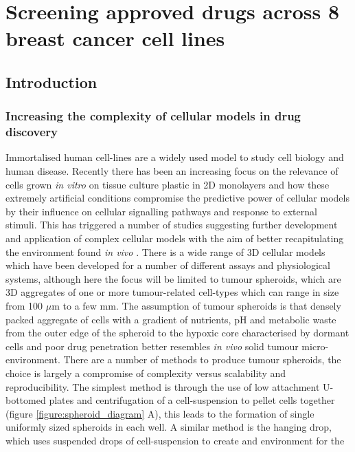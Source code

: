 \documentclass[a4paper,11pt,twoside,openright]{scrbook}
\begin{document}
\chapter{Screening approved drugs across 8 breast cancer cell lines} \label{chapter:screen}

\section{Introduction}

\subsection{Increasing the complexity of cellular models in drug discovery}

Immortalised human cell-lines are a widely used model to study cell biology and human disease.
Recently there has been an increasing focus on the relevance of cells grown \textit{in vitro} on tissue culture plastic 
in 2D monolayers and how these extremely artificial conditions compromise the predictive power of cellular models by 
their influence on cellular signalling pathways and response to external stimuli.
This has triggered a number of studies suggesting further development and application of complex cellular models with 
the aim of better recapitulating the environment found \textit{in vivo} \cite{Horvath2016}.
There is a wide range of 3D cellular models which have been developed for a number of different assays and 
physiological systems, although here the focus will be limited to tumour spheroids, which are 3D aggregates of one or 
more tumour-related cell-types which can range in size from 100 $\mu$m to a few mm.
The assumption of tumour spheroids is that densely packed aggregate of cells with a gradient of nutrients, pH and 
metabolic waste from the outer edge of the spheroid to the hypoxic core characterised by dormant cells and poor drug 
penetration better resembles \textit{in vivo} solid tumour micro-environment. \cite{Herrmann2008,Dufau2012}
There are a number of methods to produce tumour spheroids, the choice is largely a compromise of complexity versus 
scalability and reproducibility.
The simplest method is through the use of low attachment U-bottomed plates and centrifugation of a cell-suspension to 
pellet cells together (figure \ref{figure:spheroid_diagram} A), this leads to the formation of single uniformly sized 
spheroids in each well.
A similar method is the hanging drop, which uses suspended drops of cell-suspension to create and environment for the 
\end{document}
